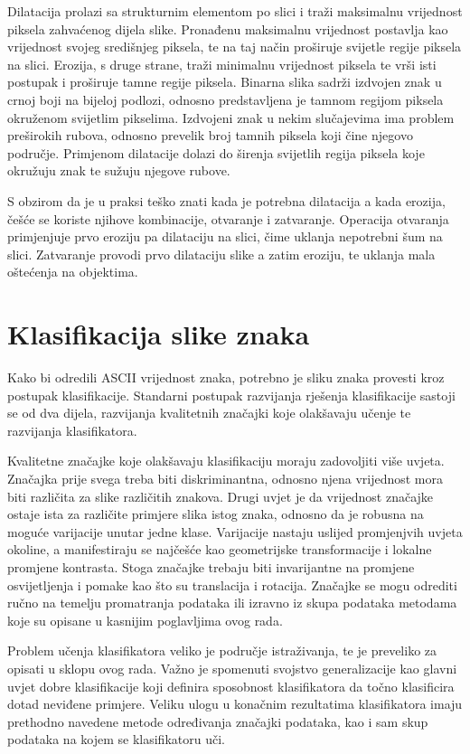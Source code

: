 \documentclass[lmodern, utf8, diplomski, numeric]{fer}
\begin{document}
Dilatacija prolazi sa strukturnim elementom po slici i traži maksimalnu vrijednost piksela zahvaćenog dijela slike. Pronađenu maksimalnu vrijednost postavlja kao vrijednost svojeg središnjeg piksela, te na taj način proširuje svijetle regije piksela na slici. Erozija, s druge strane, traži minimalnu vrijednost piksela te vrši isti postupak i proširuje tamne regije piksela. Binarna slika sadrži izdvojen znak u crnoj boji na bijeloj podlozi, odnosno predstavljena je tamnom regijom piksela okruženom svijetlim pikselima. Izdvojeni znak u nekim slučajevima ima problem preširokih rubova, odnosno prevelik broj tamnih piksela koji čine njegovo područje. Primjenom dilatacije dolazi do širenja svijetlih regija piksela koje okružuju znak te sužuju njegove rubove.

S obzirom da je u praksi teško znati kada je potrebna dilatacija a kada erozija, češće se koriste njihove kombinacije, otvaranje i zatvaranje.
Operacija otvaranja primjenjuje prvo eroziju pa dilataciju na slici, čime uklanja nepotrebni šum na slici. Zatvaranje provodi prvo dilataciju slike a zatim eroziju, te uklanja mala oštećenja na objektima. 


\section{Klasifikacija slike znaka}

Kako bi odredili ASCII vrijednost znaka, potrebno je sliku znaka provesti kroz postupak klasifikacije. Standarni postupak razvijanja rješenja klasifikacije sastoji se od dva dijela, razvijanja kvalitetnih značajki koje olakšavaju učenje te razvijanja klasifikatora. 

Kvalitetne značajke koje olakšavaju klasifikaciju moraju zadovoljiti više uvjeta. Značajka prije svega treba biti diskriminantna, odnosno njena vrijednost mora biti različita za slike različitih znakova. Drugi uvjet je da vrijednost značajke ostaje ista za različite primjere slika istog znaka, odnosno da je robusna na moguće varijacije unutar jedne klase. Varijacije nastaju uslijed promjenjvih uvjeta okoline, a manifestiraju se najčešće kao geometrijske transformacije i lokalne promjene kontrasta. Stoga značajke trebaju biti invarijantne na promjene osvijetljenja i pomake kao što su translacija i rotacija. Značajke se mogu odrediti ručno na temelju promatranja podataka ili izravno iz skupa podataka metodama koje su opisane u kasnijim poglavljima ovog rada.

Problem učenja klasifikatora veliko je područje istraživanja, te je preveliko za opisati u sklopu ovog rada. Važno je spomenuti svojstvo generalizacije kao glavni uvjet dobre klasifikacije koji definira sposobnost klasifikatora da točno klasificira dotad neviđene primjere. Veliku ulogu u konačnim rezultatima klasifikatora imaju prethodno navedene metode određivanja značajki podataka, kao i sam skup podataka na kojem se klasifikatoru uči.
\end{document}
